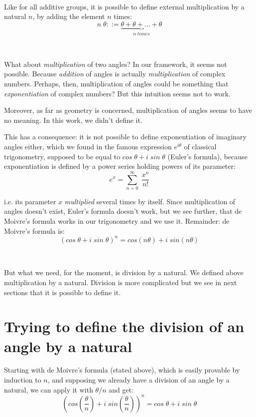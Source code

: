 \documentclass[11pt]{article}
\theoremstyle{definition}
\begin{document}
\

\noindent Like for all additive groups, it is possible to define
external multiplication by a natural $n$, by adding the element $n$
times:
\[
  n \; \theta ::=
  \underbrace{\theta + \theta + ... + \theta}_{n \; times}
\]

\

What about {\em multiplication} of two angles? In our framework, it
seems not possible. Because {\em addition} of angles is actually {\em
  multiplication} of complex numbers. Perhaps, then, multiplication of
angles could be something that {\em exponentiation} of complex
numbers? But this intuition seems not to work.

Moreover, as far as geometry is concerned, multiplication of angles
seems to have no meaning. In this work, we didn't define it.

This has a consequence: it is not possible to define exponentiation of
imaginary angles either, which we found in the famous expression
$e^{i\theta}$ of classical trigonometry, supposed to be equal to
$cos\;\theta+i\;sin\;\theta$ (Euler's formula), because exponentiation
is defined by a power series holding powers of its parameter:
\[
e^x = \sum_{n=0}^\infty{\; \frac{x^n}{n!}}
\]

i.e. its parameter $x$ {\em multiplied} several times by itself. Since
multiplication of angles doesn't exist, Euler's formula doesn't work,
but we see further, that de Moivre's formula works in our trigonometry
and we use it. Remainder: de Moivre's formula is:
\[
(cos \; \theta + i \; sin \; \theta)^n = cos (n \theta) + i \; sin (n
\theta)
\]

\

\noindent But what we need, for the moment, is division by a
natural. We defined above multiplication by a natural. Division is
more complicated but we see in next sections that it is possible to
define it.

\section{Trying to define the division of an angle by a natural}

Starting with de Moivre's formula (stated above), which is easily
provable by induction to $n$, and supposing we already have a division
of an angle by a natural, we can apply it with $\theta / n$ and get:
\[
(cos \left(\frac{\theta}{n}\right) + i \; sin
\left(\frac{\theta}{n}\right))^n = cos \; \theta + i \; sin \;
\theta
\]
\end{document}

